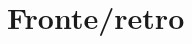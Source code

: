 \documentclass[a4paper,11pt,twoside]{article}
\begin{document}
\section*{Fronte/retro}
\lipsum[1-40]
\end{document}
